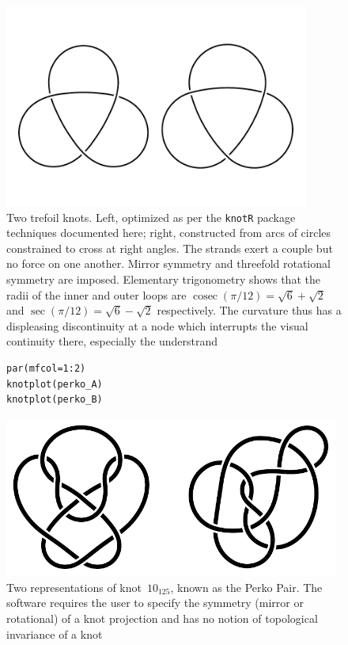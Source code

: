 \documentclass{birkjour}
\theoremstyle{definition}
\theoremstyle{remark}
\numberwithin{equation}{section}
\begin{document}
\begin{figure}[h]
  \centering  
    \includegraphics[width=10cm]{two_trefoil_knots_post_inkscape.pdf}
    \caption{Two trefoil \label{two_trefoil_knots} knots.  Left,
      optimized as per the {\tt knotR} package techniques documented
      here; right, constructed from arcs of circles constrained to
      cross at right angles.  The strands exert a couple but no force
      on one another.  Mirror symmetry and threefold rotational
      symmetry are imposed.  Elementary trigonometry shows that the
      radii of the inner and outer loops are
      $\operatorname{cosec}(\pi/12)=\sqrt{6}+\sqrt{2}$ and
      $\sec(\pi/12)=\sqrt{6}-\sqrt{2}$ respectively.  The curvature
      thus has a displeasing discontinuity at a node which interrupts
      the visual continuity there, especially the understrand}
\end{figure}

\begin{figure}[htbp]
  \begin{center}
\begin{verbatim}
par(mfcol=1:2)
knotplot(perko_A)
knotplot(perko_B)
\end{verbatim}
\includegraphics[width=11cm]{knot-perko_A_and_B}  %
\caption{Two representations of knot~$10_{125}$, known as the 
  \label{perko_AB}  Perko Pair.  The software requires the user to
  specify the symmetry (mirror or rotational) of a knot projection and
  has no notion of topological invariance of a knot}
  \end{center}
\end{figure}
\end{document}
